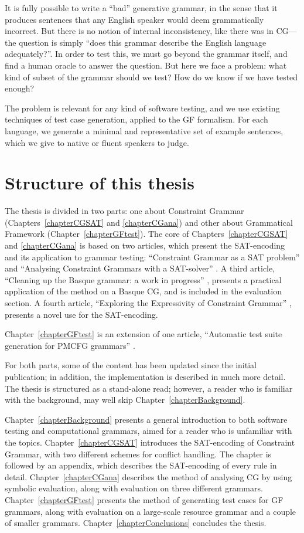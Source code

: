 It is fully possible to write a ``bad'' generative grammar, in the sense that it produces sentences that any English speaker would deem grammatically incorrect. But there is no notion of internal inconsistency, like there was in CG---the question is simply ``does this grammar describe the English language adequately?''.
In order to test this, we must go beyond the grammar itself, and find a human oracle to answer the question.
But here we face a problem: what kind of subset of the grammar should we test? How do we know if we have tested enough?

The problem is relevant for any kind of software testing, and we use existing techniques of test case generation, applied to the GF formalism. For each language, we generate a minimal and representative set of example sentences, which we give to native or fluent speakers to judge.

\section{Structure of this thesis}

The thesis is divided in two parts: one about Constraint Grammar (Chapters~\ref{chapterCGSAT} and \ref{chapterCGana}) and other about Grammatical Framework (Chapter~\ref{chapterGFtest}). The core of Chapters~\ref{chapterCGSAT}  and \ref{chapterCGana} is based on two articles, which present the SAT-encoding and its application to grammar testing: ``Constraint Grammar as a SAT problem'' \cite{listenmaa_claessen2015} 
and ``Analysing Constraint Grammars with a SAT-solver'' \cite{listenmaa_claessen2016}. 
A third article, ``Cleaning up the Basque grammar: a work in progress'' \cite{listenmaa2017basque}, presents a practical application of the method on a Basque CG, and is included in the evaluation section.
A fourth article, ``Exploring the Expressivity of Constraint Grammar'' \cite{kokke2017expressivity}, presents a novel use for the SAT-encoding.

Chapter~\ref{chapterGFtest} is an extension of one article, ``Automatic test suite generation for PMCFG grammars'' \cite{listenmaa_claessen2018}. 

For both parts, some of the content has been updated since the initial publication; in addition, the implementation is described in much more detail. The thesis is structured as a stand-alone read; however, a reader who is familiar with the background, may well skip Chapter~\ref{chapterBackground}.

Chapter~\ref{chapterBackground} presents a general introduction to both software testing and computational grammars, aimed for a reader who is unfamiliar with the topics.
Chapter~\ref{chapterCGSAT} introduces the SAT-encoding of Constraint Grammar, with two different schemes for conflict handling. The chapter is followed by an appendix, which describes the SAT-encoding of every rule in detail.
Chapter~\ref{chapterCGana}
describes the method of analysing CG by using symbolic evaluation, along with evaluation on three different grammars.
Chapter~\ref{chapterGFtest} presents the method of generating test cases for GF grammars, along with evaluation on a large-scale resource grammar and a couple of smaller grammars.
Chapter~\ref{chapterConclusions} concludes the thesis.


